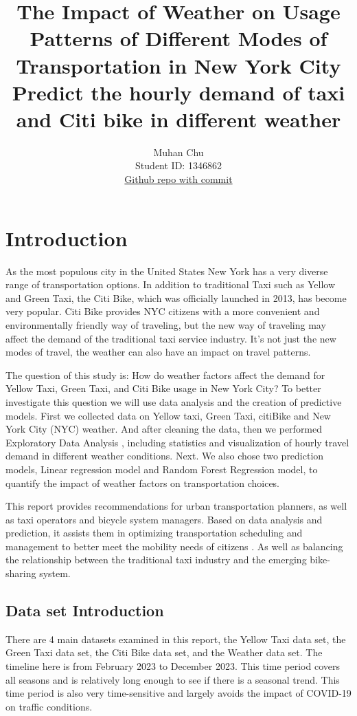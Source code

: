 \documentclass[11pt]{article}
\title{\textbf{The Impact of Weather on Usage Patterns of Different Modes of Transportation in New York City} \\ Predict the hourly demand of taxi and Citi bike in different weather}
\author{
Muhan Chu \\
Student ID: 1346862 \\
\href{https://github.com/MAST30034-AppliedDataScience/project-1-individual-MuhanChu}{Github repo with commit}
}
\begin{document}
\maketitle
\section{Introduction}
As the most populous city in the United States\cite{census} New York has a very diverse range of transportation options. In addition to traditional Taxi such as Yellow and Green Taxi, the Citi Bike, which was officially launched in 2013, has become very popular. Citi Bike provides NYC citizens with a more convenient and environmentally friendly way of traveling, but the new way of traveling may affect the demand of the traditional taxi service industry. It's not just the new modes of travel, the weather can also have an impact on travel patterns.

The question of this study is: How do weather factors affect the demand for Yellow Taxi, Green Taxi, and Citi Bike usage in New York City? To better investigate this question we will use data analysis and the creation of predictive models. First we collected data on Yellow taxi, Green Taxi, citiBike and New York City (NYC) weather. And after cleaning the data, then we performed Exploratory Data Analysis , including statistics and visualization of hourly travel demand in different weather conditions. Next. We also chose two prediction models, Linear regression model and Random Forest Regression model, to quantify the impact of weather factors on transportation choices.

This report provides recommendations for urban transportation planners, as well as taxi operators and bicycle system managers. Based on data analysis and prediction, it assists them in optimizing transportation scheduling and management to better meet the mobility needs of citizens . As well as balancing the relationship between the traditional taxi industry and the emerging bike-sharing system.

\subsection{Data set Introduction}
There are 4 main datasets examined in this report, the Yellow Taxi data set, the Green Taxi data set, the Citi Bike data set, and the Weather data set. The timeline here is from February 2023 to December 2023. This time period covers all seasons and is relatively long enough to see if there is a seasonal trend. This time period is also very time-sensitive and largely avoids the impact of COVID-19 on traffic conditions.
\end{document}
